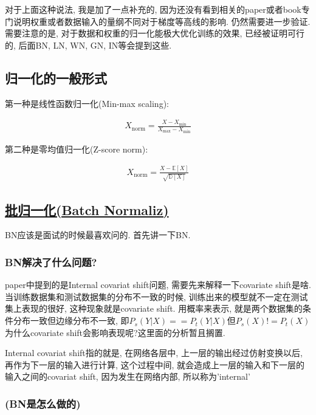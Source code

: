 \documentclass{article}
\begin{document}
对于上面这种说法, 我是加了一点补充的, 因为还没有看到相关的paper或者book专门说明权重或者数据输入的量纲不同对于梯度等高线的影响.
仍然需要进一步验证. 需要注意的是, 对于数据和权重的归一化能极大优化训练的效果, 已经被证明可行的, 后面BN, LN, WN, GN, IN等会提到这些.

\subsection{归一化的一般形式}

第一种是线性函数归一化(Min-max scaling):

\begin{align}
    X_{\text{norm}} = \frac{X - X_{\text{min}}}{X_{\text{max}} - X_{\text{min}}}
\end{align}

第二种是零均值归一化(Z-score norm):

\begin{align}
    X_{\text{norm}} = \frac{ X - \mathbb{E}[X]}{ \sqrt{\mathbb{D}[X]}}
\end{align}

\subsection{\href{http://arxiv-web1.library.cornell.edu/abs/1502.03167v1}{批归一化(Batch Normaliz)}}

BN应该是面试的时候最喜欢问的. 首先讲一下BN.

\subsubsection{BN解决了什么问题?}

paper中提到的是Internal covariat shift问题, 需要先来解释一下covariate shift是啥.
当训练数据集和测试数据集的分布不一致的时候, 训练出来的模型就不一定在测试集上表现的很好, 这种现象就是covariate shift.
用概率来表示, 就是两个数据集的条件分布一致但边缘分布不一致, 即$P_s(Y|X) == P_t(Y|X)$但$P_s(X) != P_t(X)$
为什么covariate shift会影响表现呢?这里面的分析暂且搁置.

Internal covariat shift指的就是, 在网络各层中, 上一层的输出经过仿射变换以后, 再作为下一层的输入进行计算, 这个过程中间,
就会造成上一层的输入和下一层的输入之间的covariat shift, 因为发生在网络内部, 所以称为'internal'

\subsubsection{(BN是怎么做的)}
\end{document}
